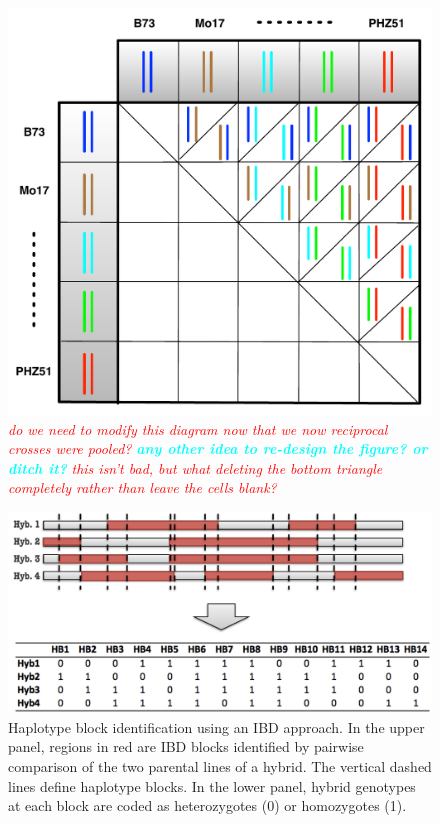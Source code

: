 \documentclass[9pt,twocolumn,twoside]{gsajnl}
\newcommand{\yang}[1]{\textcolor{cyan}{\emph{\bf  #1}} }
\newcommand{\jri}[1]{\textcolor{red}{ \emph{ #1}} }
\begin{document}
\DIFaddend \begin{figure}[htbp]
\centering
\DIFaddbeginFL \includegraphics[width=\linewidth]{SFig_diallel.pdf}
\caption{\jri{do we need to modify this diagram now that we now reciprocal crosses were pooled?} \yang{any other idea to re-design the figure? or ditch it?} \jri{this isn't bad, but what deleting the bottom triangle completely rather than leave the cells blank?} }
\label{fig:diallel}
\end{figure}


\begin{figure}[htbp]
\centering
\DIFaddendFL \includegraphics[width=\linewidth]{SFig_define_IBD.pdf}
\caption{Haplotype block identification using an IBD approach. In the upper panel, regions in red are IBD blocks identified by pairwise comparison of the two parental lines of a hybrid. The vertical dashed lines define haplotype blocks. In the lower panel, hybrid genotypes at each block are coded as heterozygotes (0) or homozygotes (1).}
\label{fig:defineibd}
\end{figure}
\end{document}
